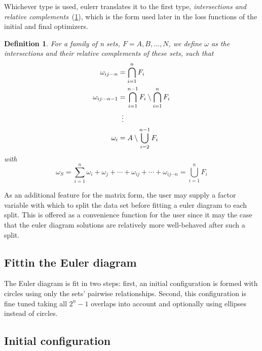 \documentclass[
  a4paper,
  nofonts,
  nobib,
  titlepage,
  justified,
  marginals=raggedouter,
  nohyper
]{tufte-handout}\usepackage[]{graphicx}\usepackage[]{color}
\newcommand{\pkg}[1]{{\fontseries{b}\selectfont #1}}
\newtheorem{mydef}{Definition}
\begin{document}
Whichever type is used, \pkg{eulerr} translates it
to the first type, \emph{intersections and relative complements}~(\cref{def:omega}),
which is the form used later in the loss functions of the initial and final optimizers.

\begin{mydef}
\label{def:omega}
For a family of \emph{n} sets, $F = A, B, \dots, N$, we define $\omega$ as the
intersections and their relative complements of these sets, such that
\begin{align*}
  \omega_{ij \cdots n}   & = \bigcap_{i=1}^n F_i  \\
  \omega_{ij \cdots n-1} & = \bigcap_{i=1}^{n-1}F_i \setminus \bigcap_{i=1}^{n}F_i \\
                         & \vdotswithin{=} \\
                \omega_i & = A \setminus \bigcup_{i=2}^{n-1}F_i
\end{align*}
with
\[
  \omega_S = \sum_{i = 1}^n \omega_i + \omega_j + \cdots +  \omega_{ij} + \cdots + \omega_{ij\cdots n} =  \bigcup_{i=1}^n F_i
\]
\end{mydef}

As an additional feature for the matrix form, the user may supply a
factor variable with which to split the data set before fitting a euler
diagram to each split. This is offered as a convenience function for the user
since it may the case that the euler diagram solutions are relatively more
well-behaved after such a split.

\subsection{Fittin the Euler diagram}

The Euler diagram is fit in two steps: first, an initial configuration is
formed with circles using only the sets' pairwise relationships. Second, this
configuration is fine tuned taking all $2^n-1$ overlaps into account and
optionally using ellipses instead of circles.

\subsection{Initial configuration}
\label{sec:initConfig}
\end{document}
